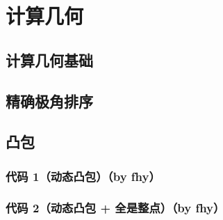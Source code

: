 \documentclass[12pt]{article}
\theoremstyle{definition}
\theoremstyle{remark}
\begin{document}
% 
% 


\newpage

{\centering\section{计算几何}}

\subsection{计算几何基础}

% 
% 
% 
% 



\newpage

\subsection{精确极角排序}



\newpage

\subsection{凸包}

\subsubsection{代码 1（动态凸包）（by fhy）}



\newpage

\subsubsection{代码 2（动态凸包 + 全是整点）（by fhy）}
\end{document}
